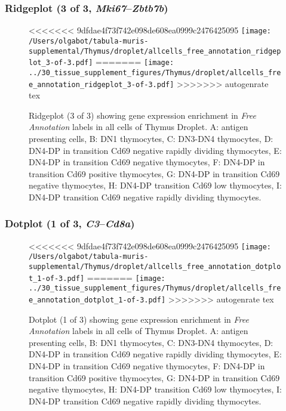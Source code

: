 \clearpage

\subsubsection{Ridgeplot (3 of 3, \emph{Mki67}--\emph{Zbtb7b})}
\begin{figure}[h]
\centering
<<<<<<< 9dfdae4f73f742e098de608ea0999c2476425095
\texttt{[image: /Users/olgabot/tabula-muris-supplemental/Thymus/droplet/allcells\_free\_annotation\_ridgeplot\_3-of-3.pdf]}
=======
\texttt{[image: ../30\_tissue\_supplement\_figures/Thymus/droplet/allcells\_free\_annotation\_ridgeplot\_3-of-3.pdf]}
>>>>>>> autogenrate tex

\caption{ Ridgeplot (3 of 3)  showing gene expression enrichment in \emph{Free Annotation} labels in all cells of Thymus Droplet. A: antigen presenting cells, B: DN1 thymocytes, C: DN3-DN4 thymocytes, D: DN4-DP in transition Cd69 negative rapidly dividing thymocytes, E: DN4-DP in transition Cd69 negative thymocytes, F: DN4-DP in transition Cd69 positive thymocytes, G: DN4-DP in transition Cd69 negative thymocytes, H: DN4-DP transition Cd69 low thymocytes, I: DN4-DP transition Cd69 negative rapidly dividing thymocytes.}
\end{figure}


\clearpage

\subsubsection{Dotplot (1 of 3, \emph{C3}--\emph{Cd8a})}
\begin{figure}[h]
\centering
<<<<<<< 9dfdae4f73f742e098de608ea0999c2476425095
\texttt{[image: /Users/olgabot/tabula-muris-supplemental/Thymus/droplet/allcells\_free\_annotation\_dotplot\_1-of-3.pdf]}
=======
\texttt{[image: ../30\_tissue\_supplement\_figures/Thymus/droplet/allcells\_free\_annotation\_dotplot\_1-of-3.pdf]}
>>>>>>> autogenrate tex

\caption{ Dotplot (1 of 3)  showing gene expression enrichment in \emph{Free Annotation} labels in all cells of Thymus Droplet. A: antigen presenting cells, B: DN1 thymocytes, C: DN3-DN4 thymocytes, D: DN4-DP in transition Cd69 negative rapidly dividing thymocytes, E: DN4-DP in transition Cd69 negative thymocytes, F: DN4-DP in transition Cd69 positive thymocytes, G: DN4-DP in transition Cd69 negative thymocytes, H: DN4-DP transition Cd69 low thymocytes, I: DN4-DP transition Cd69 negative rapidly dividing thymocytes.}
\end{figure}


